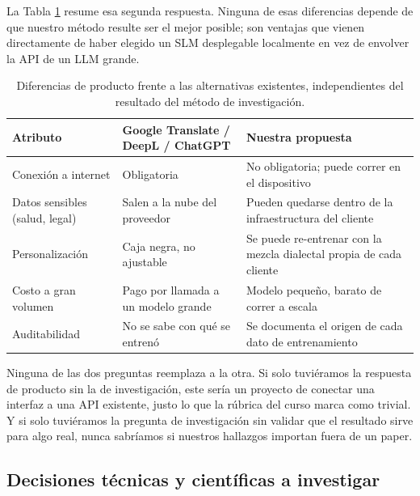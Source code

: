 \documentclass[11pt,a4paper]{article}
\begin{document}
La Tabla \ref{tab:producto} resume esa segunda respuesta. Ninguna de esas diferencias depende de que nuestro método resulte ser el mejor posible; son ventajas que vienen directamente de haber elegido un SLM desplegable localmente en vez de envolver la API de un LLM grande.

\begin{table}[h]
\centering
\small
\begin{tabular}{p{3.0cm}p{5.4cm}p{5.4cm}}
\toprule
\textbf{Atributo} & \textbf{Google Translate / DeepL / ChatGPT} & \textbf{Nuestra propuesta} \\
\midrule
Conexión a internet & Obligatoria & No obligatoria; puede correr en el dispositivo \\
\addlinespace
Datos sensibles (salud, legal) & Salen a la nube del proveedor & Pueden quedarse dentro de la infraestructura del cliente \\
\addlinespace
Personalización & Caja negra, no ajustable & Se puede re-entrenar con la mezcla dialectal propia de cada cliente \\
\addlinespace
Costo a gran volumen & Pago por llamada a un modelo grande & Modelo pequeño, barato de correr a escala \\
\addlinespace
Auditabilidad & No se sabe con qué se entrenó & Se documenta el origen de cada dato de entrenamiento \\
\bottomrule
\end{tabular}
\caption{Diferencias de producto frente a las alternativas existentes, independientes del resultado del método de investigación.}
\label{tab:producto}
\end{table}

Ninguna de las dos preguntas reemplaza a la otra. Si solo tuviéramos la respuesta de producto sin la de investigación, este sería un proyecto de conectar una interfaz a una API existente, justo lo que la rúbrica del curso marca como trivial. Y si solo tuviéramos la pregunta de investigación sin validar que el resultado sirve para algo real, nunca sabríamos si nuestros hallazgos importan fuera de un paper.

\subsection{Decisiones técnicas y científicas a investigar}
\end{document}
